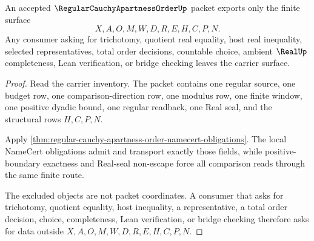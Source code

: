 \begin{theorem}
\label{thm:regular-cauchy-apartness-order-refusal-boundary}
An accepted $\RegularCauchyApartnessOrderUp$ packet exports only the finite surface
$$
X,A,O,M,W,D,R,E,H,C,P,N.
$$
Any consumer asking for trichotomy, quotient real equality, host real inequality, selected representatives, total order decisions, countable choice, ambient $\RealUp$ completeness, Lean verification, or bridge checking leaves the carrier surface.
\end{theorem}
\begin{proof}
Read the carrier inventory. The packet contains one regular source, one budget row, one comparison-direction row, one modulus row, one finite window, one positive dyadic bound, one regular readback, one Real seal, and the structural rows $H,C,P,N$.

Apply \autoref{thm:regular-cauchy-apartness-order-namecert-obligations}. The local NameCert obligations admit and transport exactly those fields, while positive-boundary exactness and Real-seal non-escape force all comparison reads through the same finite route.

The excluded objects are not packet coordinates. A consumer that asks for trichotomy, quotient equality, host inequality, a representative, a total order decision, choice, completeness, Lean verification, or bridge checking therefore asks for data outside $X,A,O,M,W,D,R,E,H,C,P,N$.
\end{proof}



